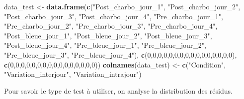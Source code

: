 \documentclass[
  french,
]{article}
\newenvironment{Shaded}{\begin{snugshade}}{\end{snugshade}}
\newcommand{\DecValTok}[1]{\textcolor[rgb]{0.00,0.00,0.81}{#1}}
\newcommand{\FunctionTok}[1]{\textcolor[rgb]{0.13,0.29,0.53}{\textbf{#1}}}
\newcommand{\NormalTok}[1]{#1}
\newcommand{\OtherTok}[1]{\textcolor[rgb]{0.56,0.35,0.01}{#1}}
\newcommand{\StringTok}[1]{\textcolor[rgb]{0.31,0.60,0.02}{#1}}
\begin{document}
\begin{Shaded}
\begin{Highlighting}[]
\NormalTok{data\_test }\OtherTok{\textless{}{-}} \FunctionTok{data.frame}\NormalTok{(}\FunctionTok{c}\NormalTok{(}\StringTok{"Post\_charbo\_jour\_1"}\NormalTok{, }\StringTok{"Post\_charbo\_jour\_2"}\NormalTok{, }\StringTok{"Post\_charbo\_jour\_3"}\NormalTok{, }\StringTok{"Post\_charbo\_jour\_4"}\NormalTok{, }\StringTok{"Pre\_charbo\_jour\_1"}\NormalTok{, }\StringTok{"Pre\_charbo\_jour\_2"}\NormalTok{, }\StringTok{"Pre\_charbo\_jour\_3"}\NormalTok{, }\StringTok{"Pre\_charbo\_jour\_4"}\NormalTok{, }\StringTok{"Post\_bleue\_jour\_1"}\NormalTok{, }\StringTok{"Post\_bleue\_jour\_2"}\NormalTok{, }\StringTok{"Post\_bleue\_jour\_3"}\NormalTok{, }\StringTok{"Post\_bleue\_jour\_4"}\NormalTok{, }\StringTok{"Pre\_bleue\_jour\_1"}\NormalTok{, }\StringTok{"Pre\_bleue\_jour\_2"}\NormalTok{, }\StringTok{"Pre\_bleue\_jour\_3"}\NormalTok{, }\StringTok{"Pre\_bleue\_jour\_4"}\NormalTok{), }\FunctionTok{c}\NormalTok{(}\DecValTok{0}\NormalTok{,}\DecValTok{0}\NormalTok{,}\DecValTok{0}\NormalTok{,}\DecValTok{0}\NormalTok{,}\DecValTok{0}\NormalTok{,}\DecValTok{0}\NormalTok{,}\DecValTok{0}\NormalTok{,}\DecValTok{0}\NormalTok{,}\DecValTok{0}\NormalTok{,}\DecValTok{0}\NormalTok{,}\DecValTok{0}\NormalTok{,}\DecValTok{0}\NormalTok{,}\DecValTok{0}\NormalTok{,}\DecValTok{0}\NormalTok{,}\DecValTok{0}\NormalTok{,}\DecValTok{0}\NormalTok{), }\FunctionTok{c}\NormalTok{(}\DecValTok{0}\NormalTok{,}\DecValTok{0}\NormalTok{,}\DecValTok{0}\NormalTok{,}\DecValTok{0}\NormalTok{,}\DecValTok{0}\NormalTok{,}\DecValTok{0}\NormalTok{,}\DecValTok{0}\NormalTok{,}\DecValTok{0}\NormalTok{,}\DecValTok{0}\NormalTok{,}\DecValTok{0}\NormalTok{,}\DecValTok{0}\NormalTok{,}\DecValTok{0}\NormalTok{,}\DecValTok{0}\NormalTok{,}\DecValTok{0}\NormalTok{,}\DecValTok{0}\NormalTok{,}\DecValTok{0}\NormalTok{))}
\FunctionTok{colnames}\NormalTok{(data\_test) }\OtherTok{\textless{}{-}} \FunctionTok{c}\NormalTok{(}\StringTok{"Condition"}\NormalTok{, }\StringTok{"Variation\_interjour"}\NormalTok{, }\StringTok{"Variation\_intrajour"}\NormalTok{)}
\end{Highlighting}
\end{Shaded}

Pour savoir le type de test à utiliser, on analyse la distribution des
résidus.
\end{document}
